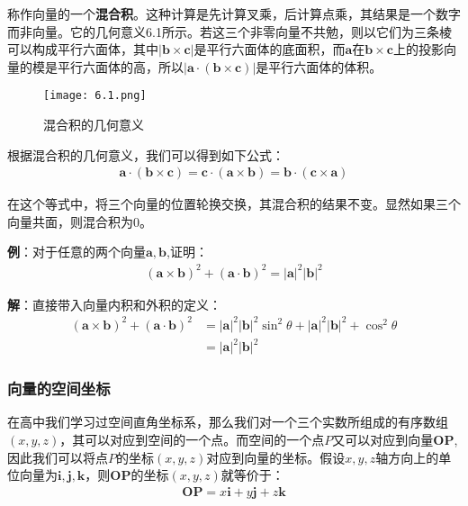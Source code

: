 \documentclass{ctexart}
\let\oldtextbf\textbf %
\renewcommand{\textbf}[1]{\textcolor{btex}{\oldtextbf{#1}}} %
\begin{document}
称作向量的一个\textbf{混合积}。这种计算是先计算叉乘，后计算点乘，其结果是一个数字而非向量。它的几何意义6.1所示。若这三个非零向量不共勉，则以它们为三条棱可以构成平行六面体，其中$|\bm{b}\times\bm{c}|$是平行六面体的底面积，而$\bm{a}$在$\bm{b}\times\bm{c}$上的投影向量的模是平行六面体的高，所以$|\bm{a}\cdot(\bm{b}\times\bm{c})|$是平行六面体的体积。
\begin{figure}[H]    
\centering     
\renewcommand{\figurename}{图}     
\renewcommand{\thefigure}{1.1}    
\begin{myimagebox}[width=0.3\textwidth] %
\texttt{[image: 6.1.png]} %
\end{myimagebox}     
\caption{\label{fig:6.1}混合积的几何意义}   
\end{figure}

根据混合积的几何意义，我们可以得到如下公式：
\begin{align*}
\bm{a}\cdot(\bm{b}\times\bm{c})=\bm{c}\cdot(\bm{a}\times\bm{b})=\bm{b}\cdot(\bm{c}\times\bm{a})\tag{6-4}
\end{align*}

在这个等式中，将三个向量的位置轮换交换，其混合积的结果不变。显然如果三个向量共面，则混合积为0。

\textbf{例}：对于任意的两个向量$\bm{a},\bm{b}$,证明：
\begin{align*}
    (\bm{a}\times\bm{b})^2+(\bm{a}\cdot\bm{b})^2=|\bm{a}|^2|\bm{b}|^2
\end{align*}

\textbf{解}：直接带入向量内积和外积的定义：
\begin{align*}
    (\bm{a}\times\bm{b})^2+(\bm{a}\cdot\bm{b})^2&=|\bm{a}|^2|\bm{b}|^2\sin^2\theta+|\bm{a}|^2|\bm{b}|^2+\cos^2\theta\\
    &=|\bm{a}|^2|\bm{b}|^2
\end{align*}

\subsubsection{向量的空间坐标}
在高中我们学习过空间直角坐标系，那么我们对一个三个实数所组成的有序数组$(x,y,z)$，其可以对应到空间的一个点。而空间的一个点$P$又可以对应到向量$\bm{OP}$,因此我们可以将点$P$的坐标$(x,y,z)$对应到向量的坐标。假设$x,y,z$轴方向上的单位向量为$\bm{i},\bm{j},\bm{k}$，则$\bm{OP}$的坐标$(x,y,z)$就等价于：
\begin{align*}
    \bm{OP}=x\bm{i}+y\bm{j}+z\bm{k}
\end{align*}
\end{document}

